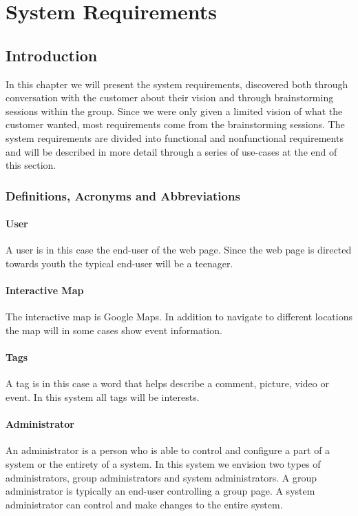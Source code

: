 \chapter{System Requirements}
\label{chap:SysReq}

\section{Introduction}
\label{sec:SysReqIntro}
In this chapter we will present the system requirements, discovered both through conversation with the customer about their vision and through brainstorming sessions within the group. Since we were only given a limited vision of what the customer wanted, most requirements come from the brainstorming sessions. The system requirements are divided into functional and nonfunctional requirements and will be described in more detail through a series of use-cases at the end of this section.

\subsection{Definitions, Acronyms and Abbreviations}
\label{subsec:SysIntroReqDefs}

\subsubsection*{User}
A user is in this case the end-user of the web page. Since the web page is directed towards youth the typical end-user will be a teenager. 

\subsubsection*{Interactive Map}
The interactive map is Google Maps. In addition to navigate to different locations the map will in some cases show event information.

\subsubsection*{Tags}
A tag is in this case a word that helps describe a comment, picture, video or event. In this system all tags will be interests. 

\subsubsection*{Administrator}
An administrator is a person who is able to control and configure a part of a system or the entirety  of a system. In this system we envision two types of administrators, group administrators and system administrators. A group administrator is typically an end-user controlling a group page. A system administrator can control and make changes to the entire system.

